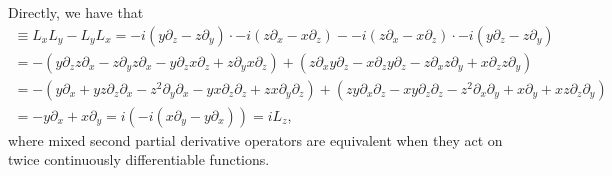 \documentclass[11pt]{article}
\begin{document}
\begin{enumerate}
\begin{enumerate}[label=(\alph*)]
        Directly, we have that \begin{multline*}[L_x,L_y]\equiv  L_xL_y - L_yL_x = -i(y\partial_z - z\partial_y)\cdot-i(z\partial_x-x\partial_z) - -i(z\partial_x-x\partial_z)\cdot -i(y\partial_z - z\partial_y) \\  = -(y\partial_zz\partial_x - z\partial_yz\partial_x-y\partial_zx\partial_z + z\partial_yx\partial_z) + (z\partial_xy\partial_z - x\partial_zy\partial_z - z\partial_xz\partial_y + x\partial_zz\partial_y) \\ = -(y\partial_x + yz\partial_z\partial_x-z^2\partial_y\partial_x - yx\partial_z\partial_z + zx\partial_y\partial_z) + (zy\partial_x\partial_z-xy\partial_z\partial_z - z^2\partial_x\partial_y + x\partial_y + xz\partial_z\partial_y)\\ = -y\partial_x+x\partial_y = i(-i(x\partial_y - y\partial_x)) = iL_z,\end{multline*}
        where mixed second partial derivative operators are equivalent when they act on twice continuously differentiable functions.
    \end{enumerate}
\end{enumerate}
\end{document}
